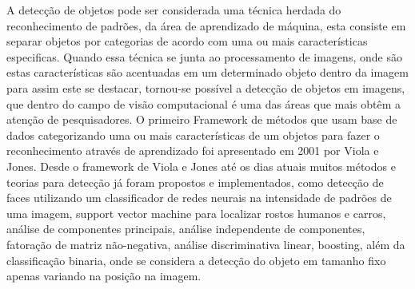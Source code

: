 A detecção de objetos pode ser considerada uma técnica herdada do reconhecimento de padrões, da área de aprendizado de máquina, esta consiste em separar objetos por categorias de acordo com uma ou mais características especificas. Quando essa técnica se junta ao processamento de imagens, onde são estas características são acentuadas em um determinado objeto dentro da imagem para assim este se destacar, tornou-se possível a detecção de objetos em imagens, que dentro do campo de visão computacional é uma das áreas que mais obtêm a atenção de pesquisadores. 
O primeiro Framework de métodos que usam base de dados categorizando uma ou mais características de um objetos para fazer o reconhecimento através de aprendizado foi apresentado em 2001 por Viola e Jones\cite{Viola:2001}. Desde o framework de Viola e Jones até os dias atuais muitos métodos e teorias para detecção já foram propostos e implementados, como detecção de faces utilizando um classificador de redes neurais na intensidade de padrões de uma imagem, support vector machine para localizar rostos humanos e carros\cite{Nascimento:2007}, análise de componentes principais, análise independente de componentes, fatoração de matriz não-negativa, análise discriminativa linear, boosting\cite{Roth:2008}, além da classificação binaria, onde se considera a detecção do objeto em tamanho fixo apenas variando na posição na imagem\cite{AmitFelzenszwalb:2014}. 






